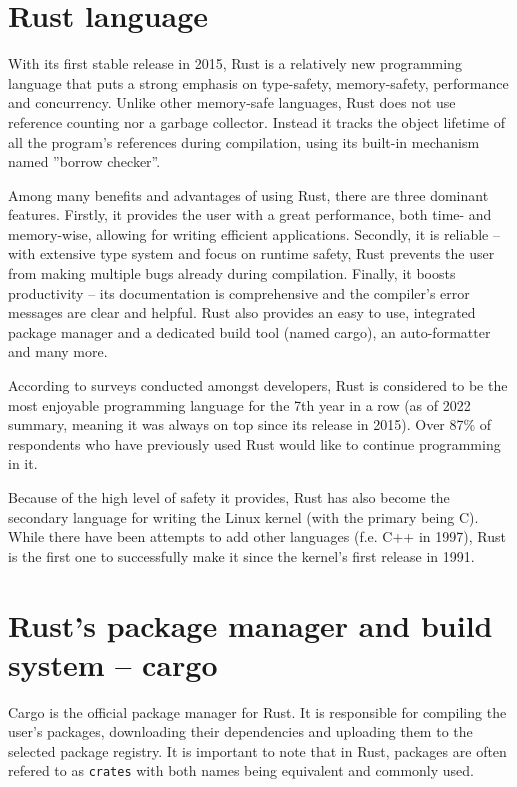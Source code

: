 \documentclass[licencjacka,en]{pracamgr}
\begin{document}
\section{Rust language}

With its first stable release in 2015, Rust is a relatively new programming language that
puts a strong emphasis on type-safety, memory-safety, performance and concurrency. Unlike
other memory-safe languages, Rust does not use reference counting nor a garbage collector.
Instead it tracks the object lifetime of all the program's references during compilation,
using its built-in mechanism named ''borrow checker''.

Among many benefits and advantages of using Rust, there are three dominant features. Firstly,
it provides the user with a great performance, both time- and memory-wise, allowing for
writing efficient applications. Secondly, it is reliable -- with extensive type system and
focus on runtime safety, Rust prevents the user from making multiple bugs
already during compilation. Finally, it boosts productivity -- its documentation is
comprehensive and the compiler's error messages are clear and helpful. Rust also provides
an easy to use, integrated package manager and a dedicated build tool (named cargo),
an auto-formatter and many more.

According to surveys \cite{survey} conducted amongst developers, Rust is considered to be the most enjoyable
programming language for the 7th year in a row (as of 2022 summary, meaning it was always on top
since its release in 2015). Over 87\% of respondents who have previously used Rust would
like to continue programming in it.

Because of the high level of safety it provides, Rust has also become the secondary
language for writing the Linux kernel (with the primary being C). While there have been
attempts to add other languages (f.e. C++ in 1997), Rust is the first one to successfully
make it since the kernel's first release in 1991.

\section{Rust's package manager and build system -- cargo}

Cargo is the official package manager for Rust. It is responsible for compiling the user's
packages, downloading their dependencies and uploading them to the selected package registry.
It is important to note that in Rust, packages are often refered to as \texttt{crates} with both names
being equivalent and commonly used.
\end{document}
